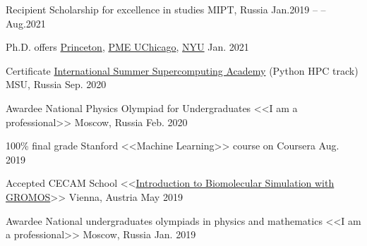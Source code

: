 
\begin{cvhonors}

  \cvhonor
    {Recipient} %
    {Scholarship for excellence in studies} %
    {MIPT, Russia} %
    {Jan.2019 -- --Aug.2021} %

  \cvhonor
    {Ph.D. offers} %
    {\href{https://chemistry.princeton.edu/theoretical}{Princeton}, \href{https://pme.uchicago.edu/about}{PME UChicago}, \href{https://wp.nyu.edu/chemistry_theory}{NYU}} %
    {} %
    {Jan. 2021} %
    
  \cvhonor
    {Certificate} %
    {\href{http://academy.hpc-russia.ru/en/organizers}{International Summer Supercomputing Academy} (Python HPC track)} %
    {MSU, Russia} %
    {Sep. 2020} %
        

  \cvhonor
    {Awardee} %
    {National Physics Olympiad for Undergraduates <<I am a professional>>} %
    {Moscow, Russia} %
    {Feb. 2020} %
        
  \cvhonor
    {100\% final grade} %
    {Stanford <<Machine Learning>> course on Coursera} %
    {} %
    {Aug. 2019} %
    
  \cvhonor
    {Accepted} %
    {CECAM School <<\href{https://www.cecam.org/workshop-details/129}{Introduction to Biomolecular Simulation with GROMOS}>>} %
    {Vienna, Austria} %
    {May 2019} %
        
    
  \cvhonor
    {Awardee} %
    {National undergraduates olympiads in physics and mathematics <<I am a professional>>} %
    {Moscow, Russia} %
    {Jan. 2019} %
    

\end{cvhonors}
